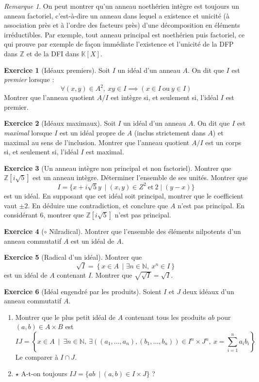 \documentclass[french]{book}
\newcommand{\N}{\mathbb{N}}
\newcommand{\Z}{\mathbb{Z}}
\newcommand{\K}{\mathbb{K}}
\theoremstyle{definition}
\newtheorem{ex}{Exercice}[chapter]
\theoremstyle{theorem}
\theoremstyle{remark}
\newtheorem*{rmq}{Remarque}
\begin{document}
\begin{rmq}
	On peut montrer qu'un anneau noethérien intègre est toujours un anneau factoriel, c'est-à-dire un anneau dans lequel a existence et unicité (à association près et à l'ordre des facteurs près) d'une décomposition en éléments irréductibles. Par exemple, tout anneau principal est noethérien puis factoriel, ce qui prouve par exemple de façon immédiate l'existence et l'unicité de la DFP dans $\Z$ et de la DFI dans $\K[X]$.
\end{rmq}

\begin{ex}[Idéaux premiers]
	Soit $I$ un idéal d'un anneau $A$. On dit que $I$ est \textit{premier} lorsque : $$\forall (x,y)\in A^2,\ xy\in I\implies (x\in I\ \text{ou}\ y\in I)$$ Montrer que l'anneau quotient $A/I$ est intègre si, et seulement si, l'idéal $I$ est premier.
\end{ex}

\begin{ex}[Idéaux maximaux]
	Soit $I$ un idéal d'un anneau $A$. On dit que $I$ est \textit{maximal} lorsque $I$ est un idéal propre de $A$ (inclus strictement dans $A$) et maximal au sens de l'inclusion. Montrer que l'anneau quotient $A/I$ est un corps si, et seulement si, l'idéal $I$ est maximal.
\end{ex}

\begin{ex}[Un anneau intègre non principal et non factoriel]
	Montrer que $\Z[i\sqrt{5}]$ est un anneau intègre. Déterminer l'ensemble de ses unités. Montrer que $$I=\{x+i\sqrt{5}y\ \mid (x,y)\in Z^2\ \text{et}\ 2\mid (y-x)\}$$ est un idéal. En supposant que cet idéal soit principal, montrer que le coefficient vaut $\pm 2$. En déduire une contradiction, et conclure que $A$ n'est pas principal. En considérant $6$, montrer que $\Z[i\sqrt{5}]$ n'est pas principal.
\end{ex}

\begin{ex}[$\circ$ Nilradical]
	Montrer que l'ensemble des éléments nilpotents d'un anneau commutatif $A$ est un idéal de $A$.
\end{ex}

\begin{ex}[Radical d'un idéal]
	Montrer que $$\sqrt{I}=\left\{x\in A \ \mid \exists n\in\N,\ x^n\in I\right\}$$ est un idéal de $A$ contenant $I$. Montrer que $\displaystyle\sqrt{\sqrt{I}}=\sqrt{I}$.
\end{ex}

\begin{ex}[Idéal engendré par les produits]
	Soient $I$ et $J$ deux idéaux d'un anneau commutatif $A$.
	\begin{enumerate}
		\item Montrer que le plus petit idéal de $A$ contenant tous les produits $ab$ pour $(a,b)\in A\times B$ est $$IJ=\left\{x\in A\ \mid\ \exists n\in\N,\ \exists((a_1,\ldots,a_n),(b_1,\ldots,b_n))\in I^n\times J^n,\ x=\sum_{i=1}^{n}a_ib_i\right\}$$ Le comparer à $I\cap J$.
		\item $\star$ A-t-on toujours $IJ=\{ab\ \mid (a,b)\in I\times J\}$ ?
	\end{enumerate}
\end{ex}
\end{document}
